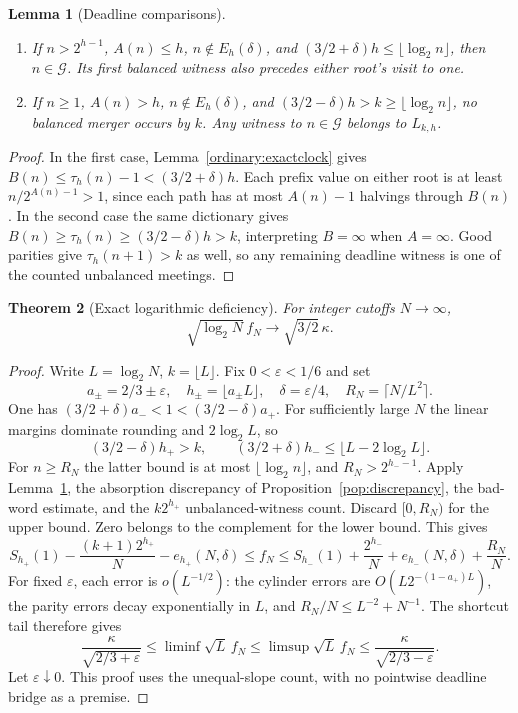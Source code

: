 \documentclass[11pt]{amsart}
\newtheorem{theorem}{Theorem}[section]
\newtheorem{lemma}[theorem]{Lemma}
\theoremstyle{definition}
\theoremstyle{remark}
\begin{document}
\begin{lemma}[Deadline comparisons]\label{gaoexact:deadline}
\begin{enumerate}
\item If $n>2^{h-1}$, $A(n)\le h$, $n\notin E_h(\delta)$, and
$(3/2+\delta)h\le\lfloor\log_2n\rfloor$, then $n\in\mathcal G$.
Its first balanced witness also precedes either root's visit to one.
\item If $n\ge1$, $A(n)>h$, $n\notin E_h(\delta)$, and
$(3/2-\delta)h>k\ge\lfloor\log_2n\rfloor$, no balanced merger
occurs by $k$. Any witness to $n\in\mathcal G$ belongs to $L_{k,h}$.
\end{enumerate}
\end{lemma}
\begin{proof}
In the first case, Lemma~\ref{ordinary:exactclock} gives
$B(n)\le\tau_h(n)-1<(3/2+\delta)h$. Each prefix value on either root
is at least $n/2^{A(n)-1}>1$, since each path has at most $A(n)-1$
halvings through $B(n)$.
In the second case the same dictionary gives
$B(n)\ge\tau_h(n)\ge(3/2-\delta)h>k$, interpreting $B=\infty$
when $A=\infty$. Good parities give $\tau_h(n+1)>k$ as well, so any
remaining deadline witness is one of the counted unbalanced meetings.
\end{proof}

\begin{theorem}[Exact logarithmic deficiency]\label{gaoexact:loglimit}
For integer cutoffs $N\to\infty$,
\[
 \sqrt{\log_2N}\,f_N\longrightarrow\sqrt{3/2}\,\kappa.
\]
\end{theorem}
\begin{proof}
Write $L=\log_2N$, $k=\lfloor L\rfloor$. Fix $0<\varepsilon<1/6$ and set
\[
 a_\pm=2/3\pm\varepsilon,\quad h_\pm=\lfloor a_\pm L\rfloor,
 \quad\delta=\varepsilon/4,\quad R_N=\lceil N/L^2\rceil.
\]
One has $(3/2+\delta)a_-<1<(3/2-\delta)a_+$. For sufficiently large
$N$ the linear margins dominate rounding and $2\log_2L$, so
\[
 (3/2-\delta)h_+>k,\qquad
 (3/2+\delta)h_-\le\lfloor L-2\log_2L\rfloor.
\]
For $n\ge R_N$ the latter bound is at most $\lfloor\log_2n\rfloor$,
and $R_N>2^{h_--1}$. Apply Lemma~\ref{gaoexact:deadline}, the absorption
discrepancy of Proposition~\ref{pop:discrepancy}, the bad-word estimate,
and the $k2^{h_+}$ unbalanced-witness count. Discard $[0,R_N)$ for the
upper bound. Zero belongs to the complement for the lower bound. This gives
\[
 S_{h_+}(1)-\frac{(k+1)2^{h_+}}N-e_{h_+}(N,\delta)
 \le f_N\le
 S_{h_-}(1)+\frac{2^{h_-}}N+e_{h_-}(N,\delta)+\frac{R_N}N.
\]
For fixed $\varepsilon$, each error is $o(L^{-1/2})$: the cylinder errors
are $O(L2^{-(1-a_+)L})$, the parity errors decay exponentially in $L$,
and $R_N/N\le L^{-2}+N^{-1}$. The shortcut tail therefore gives
\[
 \frac{\kappa}{\sqrt{2/3+\varepsilon}}
 \le\liminf\sqrt L\,f_N\le\limsup\sqrt L\,f_N
 \le\frac{\kappa}{\sqrt{2/3-\varepsilon}}.
\]
Let $\varepsilon\downarrow0$. This proof uses the unequal-slope count,
with no pointwise deadline bridge as a premise.
\end{proof}
\end{document}
